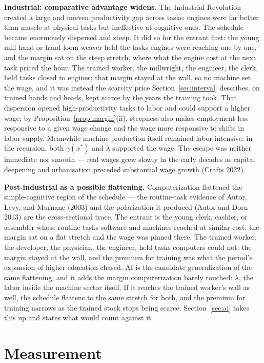 \documentclass[12pt]{article}
\theoremstyle{plain}
\begin{document}
\textbf{Industrial: comparative advantage widens.} The Industrial Revolution created a large and uneven productivity gap across tasks: engines were far better than muscle at physical tasks but ineffective at cognitive ones. The schedule became enormously dispersed and steep. It did so for the entrant first: the young mill hand or hand-loom weaver held the tasks engines were reaching one by one, and the margin sat on the steep stretch, where what the engine cost at the next task priced the hour. The trained worker, the millwright, the engineer, the clerk, held tasks closed to engines; that margin stayed at the wall, so no machine set the wage, and it was instead the scarcity price Section~\ref{sec:interval} describes, on trained hands and heads, kept scarce by the years the training took. That dispersion opened high-productivity tasks to labor and could support a higher wage; by Proposition~\ref{prop:margin}(ii), steepness also makes employment less responsive to a given wage change and the wage more responsive to shifts in labor supply. Meanwhile machine production itself remained labor-intensive: in the recursion, both $\gamma (x^*)$ and $\lambda$ supported the wage. The escape was neither immediate nor smooth --- real wages grew slowly in the early decades as capital deepening and urbanisation preceded substantial wage growth (Crafts 2022).

\textbf{Post-industrial as a possible flattening.} Computerization flattened the simple-cognitive region of the schedule --- the routine-task evidence of Autor, Levy, and Murnane (2003) and the polarization it produced (Autor and Dorn 2013) are the cross-sectional trace. The entrant is the young clerk, cashier, or assembler whose routine tasks software and machines reached at similar cost: the margin sat on a flat stretch and the wage was pinned there. The trained worker, the developer, the physician, the engineer, held tasks computers could not: the margin stayed at the wall, and the premium for training was what the period's expansion of higher education chased. AI is the candidate generalization of the same flattening, and it adds the margin computerization barely touched: $\lambda$, the labor inside the machine sector itself. If it reaches the trained worker's wall as well, the schedule flattens to the same stretch for both, and the premium for training narrows as the trained stock stops being scarce. Section~\ref{sec:ai} takes this up and states what would count against it.

\section{Measurement}\label{sec:measurement}
\end{document}
